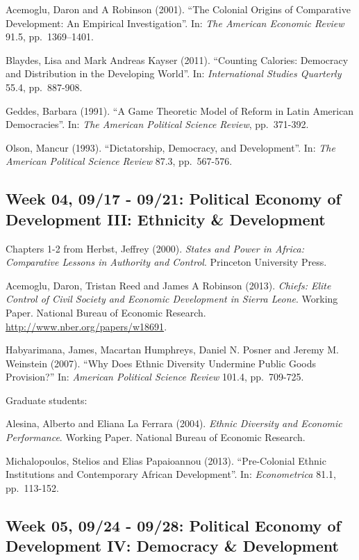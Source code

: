\documentclass[11pt,]{article}
\begin{document}
Acemoglu, Daron and A Robinson (2001). ``The Colonial Origins of
Comparative Development: An Empirical Investigation''. In:
\emph{The American Economic Review} 91.5, pp.~1369--1401.

Blaydes, Lisa and Mark Andreas Kayser (2011). ``Counting Calories:
Democracy and Distribution in the Developing World''. In:
\emph{International Studies Quarterly} 55.4, pp.~887-908.

Geddes, Barbara (1991). ``A Game Theoretic Model of Reform in Latin
American Democracies''. In:
\emph{The American Political Science Review}, pp.~371-392.

Olson, Mancur (1993). ``Dictatorship, Democracy, and Development''. In:
\emph{The American Political Science Review} 87.3, pp.~567-576.

\subsection{Week 04, 09/17 - 09/21: Political Economy of Development
III: Ethnicity \&
Development}\label{week-04-0917---0921-political-economy-of-development-iii-ethnicity-development}

Chapters 1-2 from Herbst, Jeffrey (2000).
\emph{States and Power in Africa: Comparative Lessons in Authority and Control}.
Princeton University Press.

Acemoglu, Daron, Tristan Reed and James A Robinson (2013).
\emph{Chiefs: Elite Control of Civil Society and Economic Development in Sierra Leone}.
Working Paper. National Bureau of Economic Research.
\url{http://www.nber.org/papers/w18691}.

Habyarimana, James, Macartan Humphreys, Daniel N. Posner and Jeremy M.
Weinstein (2007). ``Why Does Ethnic Diversity Undermine Public Goods
Provision?'' In: \emph{American Political Science Review} 101.4,
pp.~709-725.

Graduate students:

Alesina, Alberto and Eliana La Ferrara (2004).
\emph{Ethnic Diversity and Economic Performance}. Working Paper.
National Bureau of Economic Research.

Michalopoulos, Stelios and Elias Papaioannou (2013). ``Pre-Colonial
Ethnic Institutions and Contemporary African Development''. In:
\emph{Econometrica} 81.1, pp.~113-152.

\subsection{Week 05, 09/24 - 09/28: Political Economy of Development IV:
Democracy \&
Development}\label{week-05-0924---0928-political-economy-of-development-iv-democracy-development}
\end{document}
